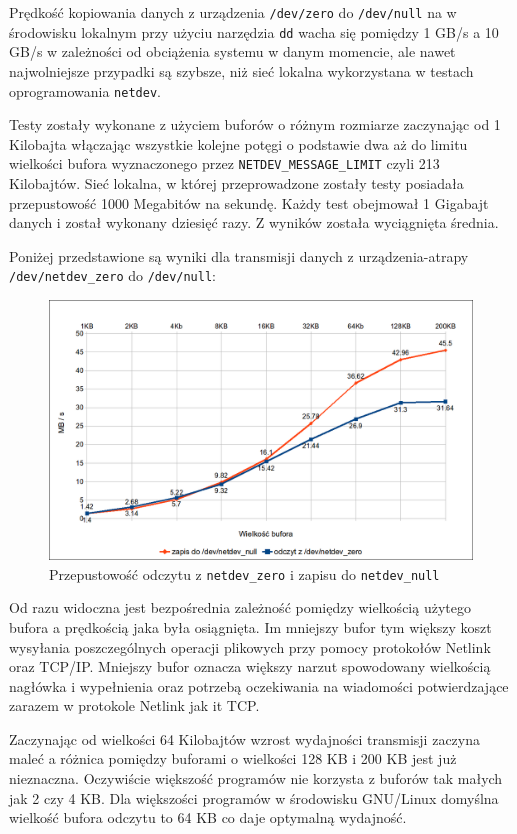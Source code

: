 \documentclass[11pt]{scrartcl}
\begin{document}
Prędkość kopiowania danych z urządzenia \texttt{/dev/zero} do \texttt{/dev/null} na w środowisku lokalnym przy użyciu narzędzia \texttt{dd} wacha się pomiędzy 1 GB/s a 10 GB/s w zależności od obciążenia systemu w danym momencie, ale nawet najwolniejsze przypadki są szybsze, niż sieć lokalna wykorzystana w testach oprogramowania \texttt{netdev}.

Testy zostały wykonane z użyciem buforów o różnym rozmiarze zaczynając od 1 Kilobajta włączając wszystkie kolejne potęgi o podstawie dwa aż do limitu wielkości bufora wyznaczonego przez \texttt{NETDEV\_MESSAGE\_LIMIT} czyli 213 Kilobajtów. Sieć lokalna, w której przeprowadzone zostały testy posiadała przepustowość 1000 Megabitów na sekundę. Każdy test obejmował 1 Gigabajt danych i został wykonany dziesięć razy. Z wyników została wyciągnięta średnia.

Poniżej przedstawione są wyniki dla transmisji danych z urządzenia-atrapy \texttt{/dev/netdev\_zero} do \texttt{/dev/null}:

\begin{figure}[H]
    \caption{Przepustowość odczytu z \texttt{netdev\_zero} i zapisu do \texttt{netdev\_null}}
    \includegraphics[width=\linewidth]{speeddevzerocomp}
\end{figure}

Od razu widoczna jest bezpośrednia zależność pomiędzy wielkością użytego bufora a prędkością jaka była osiągnięta. Im mniejszy bufor tym większy koszt wysyłania poszczególnych operacji plikowych przy pomocy protokołów Netlink oraz TCP/IP\@. Mniejszy bufor oznacza większy narzut spowodowany wielkością nagłówka i wypełnienia oraz potrzebą oczekiwania na wiadomości potwierdzające zarazem w protokole Netlink jak it TCP\@.

Zaczynając od wielkości 64 Kilobajtów wzrost wydajności transmisji zaczyna maleć a różnica pomiędzy buforami o wielkości 128 KB i 200 KB jest już nieznaczna. Oczywiście większość programów nie korzysta z buforów tak małych jak 2 czy 4 KB\@. Dla większości programów w środowisku GNU/Linux domyślna wielkość bufora odczytu to 64 KB co daje optymalną wydajność.
\end{document}

